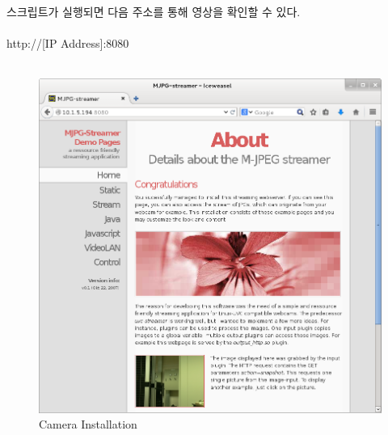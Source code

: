 \documentclass[11pt
  , a4paper
  , article
  , oneside
]{memoir}
\begin{document}
스크립트가 실행되면 다음 주소를 통해 영상을 확인할 수 있다.\\
\\
http://[IP Address]:8080 \\
\\
\begin{figure}[h]
\centering
\includegraphics[width=1\textwidth]{./images/raspberry/web_streaming.png}
\caption{Camera Installation}
\label{fig:web_stream_cam}
\end{figure}
\end{document}
